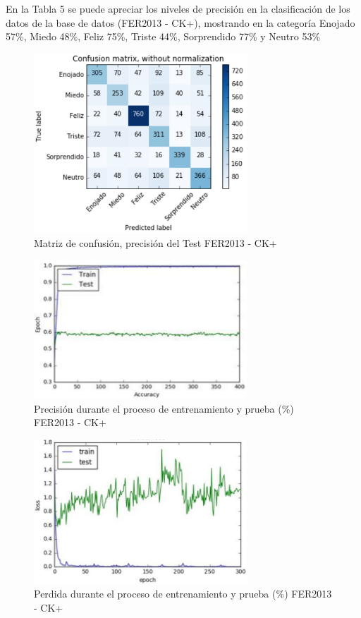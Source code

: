 En la Tabla 5 se puede apreciar los niveles de precisión en la clasificación de los
datos de la base de datos (FER2013 - CK+), mostrando en la categoría Enojado 57\%,
Miedo 48\%, Feliz 75\%, Triste 44\%, Sorprendido 77\% y Neutro 53\%

\begin{figure}[H]
		\centering
		\includegraphics[width=80mm]{./Imagenes/matriz_confusion_fer_ck+.png}
		\caption{Matriz de confusión, precisión del Test FER2013 - CK+}
		\label{fig:matriz_confusion_fer_ck+}
\end{figure}

\begin{figure}[H]
		\centering
		\includegraphics[width=80mm]{./Imagenes/precision_fer_ck+.png}
		\caption{Precisión durante el proceso de entrenamiento y prueba (\%) FER2013 - CK+}
		\label{fig:precision_fer_ck+}
\end{figure}

\begin{figure}[H]
		\centering
		\includegraphics[width=80mm]{./Imagenes/perdida_fer_ck+.png}
		\caption{Perdida durante el proceso de entrenamiento y prueba (\%) FER2013 - CK+}
		\label{fig:perdida_fer_ck+}
\end{figure}


